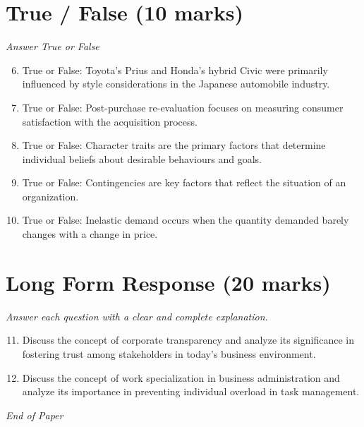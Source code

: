 \documentclass[12pt]{article}
\begin{document}
\section*{True / False (10 marks)}
\textit{Answer True or False}
\begin{enumerate}[label=\arabic*.]
\setcounter{enumi}{5}
\item True or False: Toyota's Prius and Honda's hybrid Civic were primarily influenced by style considerations in the Japanese automobile industry.
\item True or False: Post-purchase re-evaluation focuses on measuring consumer satisfaction with the acquisition process.
\item True or False: Character traits are the primary factors that determine individual beliefs about desirable behaviours and goals.
\item True or False: Contingencies are key factors that reflect the situation of an organization.
\item True or False: Inelastic demand occurs when the quantity demanded barely changes with a change in price.
\end{enumerate}

\section*{Long Form Response (20 marks)}
\textit{Answer each question with a clear and complete explanation.}
\begin{enumerate}[label=\arabic*.]
\setcounter{enumi}{10}
\item Discuss the concept of corporate transparency and analyze its significance in fostering trust among stakeholders in today's business environment.
\item Discuss the concept of work specialization in business administration and analyze its importance in preventing individual overload in task management.
\end{enumerate}

\vfill
\noindent\textit{End of Paper}
\end{document}

